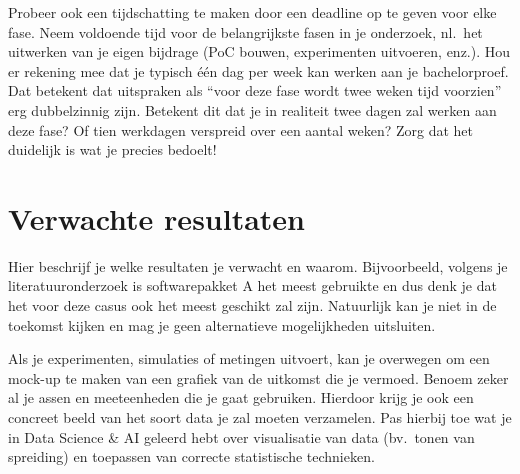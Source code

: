 \documentclass{hogent-article}
\begin{document}
Probeer ook een tijdschatting te maken door een deadline op te geven voor elke fase. Neem voldoende tijd voor de belangrijkste fasen in je onderzoek, nl.\ het uitwerken van je eigen bijdrage (PoC bouwen, experimenten uitvoeren, enz.). Hou er rekening mee dat je typisch één dag per week kan werken aan je bachelorproef. Dat betekent dat uitspraken als ``voor deze fase wordt twee weken tijd voorzien'' erg dubbelzinnig zijn. Betekent dit dat je in realiteit twee dagen zal werken aan deze fase? Of tien werkdagen verspreid over een aantal weken? Zorg dat het duidelijk is wat je precies bedoelt!

%
%
%

\section{Verwachte resultaten}%
\label{sec:verwachte-resultaten}


Hier beschrijf je welke resultaten je verwacht en waarom. Bijvoorbeeld, volgens je literatuuronderzoek is softwarepakket A het meest gebruikte en dus denk je dat het voor deze casus ook het meest geschikt zal zijn. Natuurlijk kan je niet in de toekomst kijken en mag je geen alternatieve mogelijkheden uitsluiten.

Als je experimenten, simulaties of metingen uitvoert, kan je overwegen om een mock-up te maken van een grafiek van de uitkomst die je vermoed. Benoem zeker al je assen en meeteenheden die je gaat gebruiken. Hierdoor krijg je ook een concreet beeld van het soort data je zal moeten verzamelen. Pas hierbij toe wat je in Data Science \& AI geleerd hebt over visualisatie van data (bv.\ tonen van spreiding) en toepassen van correcte statistische technieken.
\end{document}
